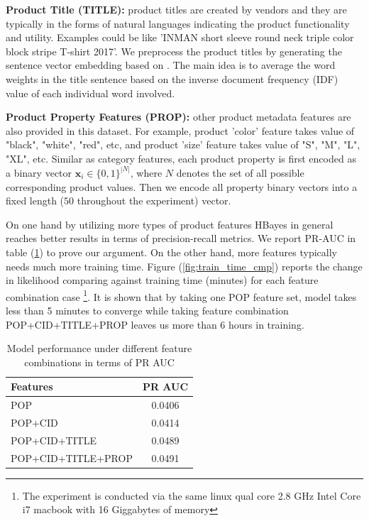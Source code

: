 \textbf{Product Title (TITLE):} product titles are created by vendors and they are typically in the forms of natural languages indicating the product functionality and utility.  Examples could be like 'INMAN short sleeve round neck triple color block stripe T-shirt 2017'.  We preprocess the product titles by generating the sentence vector embedding based on \cite{de2016representation}.  The main idea is to average the word weights in the title sentence based on the inverse document frequency (IDF) value of each individual word involved.

\textbf{Product Property Features (PROP):} other product metadata features are also provided in this dataset. For example,  product 'color' feature takes value of "black", "white", "red", etc, and product 'size' feature takes value of "S", "M", "L", "XL", etc.  Similar as category features, each product property is first encoded as a binary vector $\bm{x}_i \in \{0, 1\}^{|N|}$, where $N$ denotes the set of all possible corresponding product values.  Then we encode all property binary vectors into a fixed length ($50$ throughout the experiment) vector. %

On one hand by utilizing more types of product features HBayes in general reaches better results in terms of precision-recall metrics.  We report PR-AUC in table (\ref{tab:features_cmp}) to prove our argument.   On the other hand, more features typically needs much more training time.  Figure (\ref{fig:train_time_cmp}) reports the change in likelihood comparing against training time (minutes) for each feature combination case \footnote{The experiment is conducted via the same linux qual core 2.8 GHz Intel Core i7 macbook with 16 Giggabytes of memory}.   It is shown that by taking one POP feature set, model takes less than 5 minutes to converge while taking feature combination POP+CID+TITLE+PROP leaves us more than 6 hours in training.   

\begin{table}[htb]
\centering
\begin{tabular}{l|c}
\toprule
\textbf{Features} & \textbf{PR AUC} \\
\hline
POP & 0.0406 \\
\rowcolor{mygray}
POP+CID & 0.0414 \\
POP+CID+TITLE & 0.0489 \\
\rowcolor{mygray}
POP+CID+TITLE+PROP & 0.0491 \\
\bottomrule
\end{tabular}
\caption{Model performance under different feature combinations in terms of PR AUC}
\label{tab:features_cmp}
\end{table}

